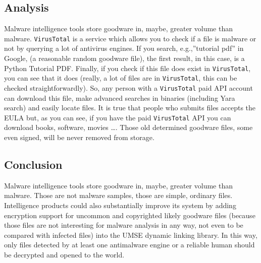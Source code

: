 \subsection{Analysis}

Malware intelligence tools store goodware in, maybe, greater volume than
malware.  \texttt{VirusTotal} is a service which allows you to check if a file
is malware or not by querying a lot of antivirus engines.  If you search,
e.g.,''tutorial pdf'' in Google, (a reasonable random goodware file), the
first result, in this case, is a Python Tutorial PDF. Finally, if you check if
this file does exist in \texttt{VirusTotal}, you can see that it does (really,
a lot of files are in \texttt{VirusTotal}, this can be checked
straightforwardly). So, any person with a \texttt{VirusTotal} paid API account
can download this file, make advanced searches in binaries (including Yara
search) and easily locate files\cite{VirusTotalFileSearch2020}. It is true that people who submits files
accepts the EULA but, as you can see, if you have the paid \texttt{VirusTotal}
API you can download books, software, movies \dots. Those old determined
goodware files, some even signed, will be never removed from storage.

\subsection{Conclusion}

Malware intelligence tools store goodware in, maybe, greater volume than
malware\cite{IntrusionDetectionNetworks}. Those are not malware samples, those are simple, ordinary files.
Intelligence products could also substantially improve its system by adding
encryption support for uncommon and copyrighted likely goodware files (because
those files are not interesting for malware analysis in any way, not even to
be compared with infected files) into the UMSE dynamic linking library. In
this way, only files detected by at least one antimalware engine or a reliable
human should be decrypted and opened to the world.

